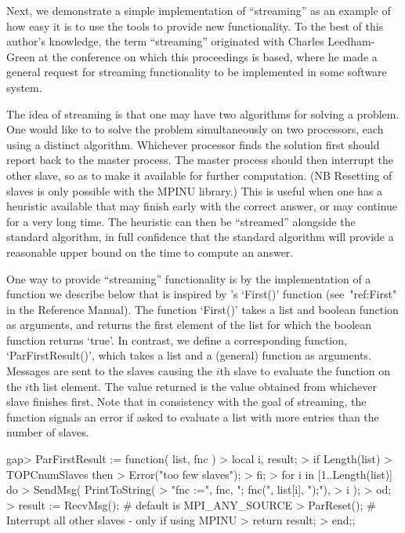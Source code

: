 
Next, we demonstrate a  simple  implementation  of  ``streaming''  as  an
example of how easy it is to use  the  {\ParGAP}  tools  to  provide  new
functionality.  To  the  best  of  this  author's  knowledge,  the   term
``streaming'' originated with Charles Leedham-Green at the conference  on
which this proceedings is based, where he  made  a  general  request  for
streaming functionality to be implemented in some software system.

The idea of streaming is that one may have two algorithms for  solving  a
problem. One would like to to solve the  problem  simultaneously  on  two
processors, each using a distinct algorithm.  Whichever  processor  finds
the solution first should report back to the master process.  The  master
process should then interrupt the other slave, so as to make it available
for further  computation. (NB Resetting of slaves is only possible with
the MPINU library.) This  is  useful  when  one  has  a  heuristic
available that may finish early with the correct answer, or may  continue
for a very long time. The heuristic can then  be  ``streamed''  alongside
the standard algorithm, in full confidence that  the  standard  algorithm
will provide a reasonable upper bound on the time to compute an answer.

One way to provide ``streaming'' functionality is by  the  implementation
of a function we describe below that is inspired  by  {\GAP}'s  `First()'
function (see~"ref:First" in the {\GAP} Reference Manual).  The  function
`First()' takes a list and boolean function as arguments, and returns the
first element of the list for which the boolean function returns  `true'.
In   contrast,   we   define   a   corresponding   {\ParGAP}    function,
`ParFirstResult()', which takes  a  list  and  a  (general)  function  as
arguments. Messages are sent to the slaves causing  the  $i$th  slave  to
evaluate the function on the $i$th list element. The  value  returned  is
the value obtained from whichever slave  finishes  first.  Note  that  in
consistency with the goal of streaming, the function signals an error  if
asked to evaluate a list with more entries than the number of slaves.

\beginexample
gap> ParFirstResult := function( list, fnc )
>   local i, result;
>   if Length(list) > TOPCnumSlaves then
>     Error("too few slaves");
>   fi;
>   for i in [1..Length(list)] do
>     SendMsg( PrintToString(
>                   "fnc :=", fnc, "; fnc(", list[i], ");"),
>              i );
>   od;
>   result := RecvMsg(); # default is MPI_ANY_SOURCE
>   ParReset(); # Interrupt all other slaves - only if using MPINU
>   return result;
> end;;
\endexample

